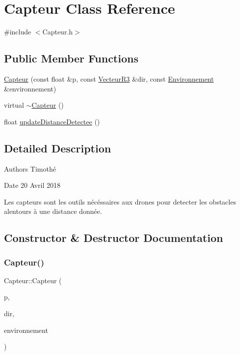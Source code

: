 \hypertarget{class_capteur}{}\section{Capteur Class Reference}
\label{class_capteur}


{\ttfamily \#include $<$Capteur.\+h$>$}

\subsection*{Public Member Functions}
\begin{DoxyCompactItemize}
\item 
\mbox{\hyperlink{class_capteur_ad1624871d1a446c027c3fab7407b0537}{Capteur}} (const float \&p, const \mbox{\hyperlink{class_vecteur_r3}{Vecteur\+R3}} \&dir, const \mbox{\hyperlink{class_environnement}{Environnement}} \&environnement)
\item 
virtual \mbox{\hyperlink{class_capteur_a2bbfecdceba5e9a13fc7c55cc5f7eae3}{$\sim$\+Capteur}} ()
\item 
float \mbox{\hyperlink{class_capteur_ad44e85330ca70484a928c9f89ecf9c0a}{update\+Distance\+Detectee}} ()
\end{DoxyCompactItemize}


\subsection{Detailed Description}
\begin{DoxyAuthor}{Authors}
Timothé 
\end{DoxyAuthor}
\begin{DoxyDate}{Date}
20 Avril 2018
\end{DoxyDate}
Les capteurs sont les outils nécéssaires aux drones pour detecter les obstacles alentours à une distance donnée. 

\subsection{Constructor \& Destructor Documentation}
\mbox{\label{class_capteur_ad1624871d1a446c027c3fab7407b0537}} 
\subsubsection{\texorpdfstring{Capteur()}{Capteur()}}
{\footnotesize\ttfamily Capteur\+::\+Capteur (\begin{DoxyParamCaption}\item[{const float \&}]{p,  }\item[{const \mbox{\hyperlink{class_vecteur_r3}{Vecteur\+R3}} \&}]{dir,  }\item[{const \mbox{\hyperlink{class_environnement}{Environnement}} \&}]{environnement }\end{DoxyParamCaption})}


